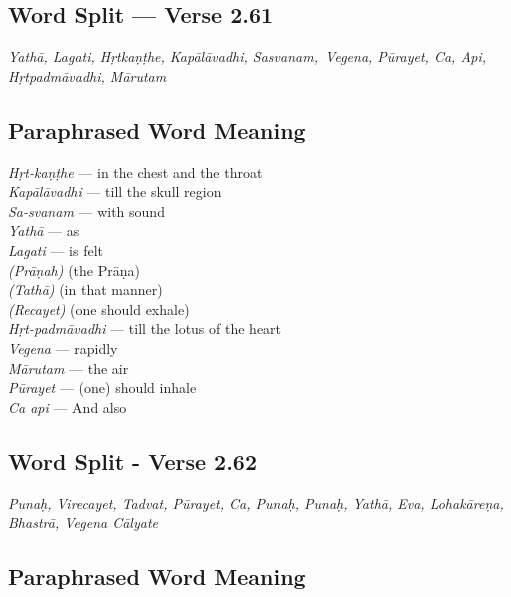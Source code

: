\subsection*{Word Split --- Verse 2.61}

\textit{Yathā, Lagati, Hṛtkaṇṭhe, Kapālāvadhi, Sasvanam, Vegena, Pūrayet, Ca, Api, Hṛtpadmāvadhi, Mārutam}
\newpage
\subsection*{Paraphrased Word Meaning}

\begin{multicols}{2}
\textit{Hṛt-kaṇṭhe} --- in the chest and the throat\\
\textit{Kapālāvadhi} --- till the skull  region\\
\textit{Sa-svanam} --- with sound \\
\textit{Yathā} --- as \\
\textit{Lagati} --- is felt \\
\textit{(Prāṇah)}  (the Prāṇa)\\
\textit{(Tathā)} (in that manner)\\
\textit{(Recayet)} (one should exhale)\\
\textit{Hṛt-padmāvadhi} --- till the lotus of the heart  \\
\textit{Vegena} --- rapidly \\
\textit{Mārutam} --- the air\\ 
\textit{Pūrayet} --- (one) should inhale \\
\textit{Ca api} --- And also 
\end{multicols}

\subsection*{Word Split - Verse 2.62}


\textit{Punaḥ, Virecayet, Tadvat, Pūrayet, Ca, Punaḥ, Punaḥ,  Yathā, Eva, Lohakāreṇa, Bhastrā, Vegena Cālyate}

\subsection*{Paraphrased Word Meaning}


